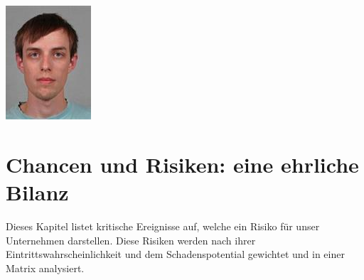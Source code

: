 \begin{minipage}{0.3\textwidth}\raggedright
	\includegraphics[width=\textwidth]{images/team/fhauser}
\end{minipage}

\clearpage
\section{Chancen und Risiken: eine ehrliche Bilanz}

Dieses Kapitel listet kritische Ereignisse auf, welche ein Risiko für unser Unternehmen darstellen. Diese Risiken werden nach ihrer Eintrittswahrscheinlichkeit und dem Schadenspotential gewichtet und in einer Matrix analysiert.

